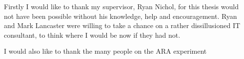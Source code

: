 Firstly I would like to thank my supervisor, Ryan Nichol, for this thesis would not have been possible without his knowledge, help and encouragement. Ryan and Mark Lancaster were willing to take a chance on a rather dissillusioned IT consultant, to think where I would be now if they had not.

I would also like to thank the many people on the ARA experiment 
